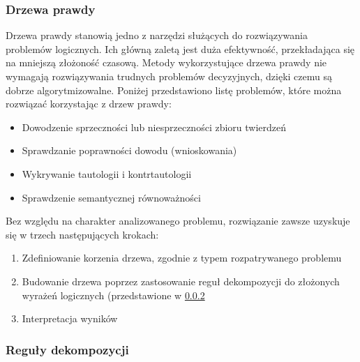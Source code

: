 \documentclass[12pt,a4paper,titlepage]{article}
\begin{document}
\subsubsection{Drzewa prawdy}
Drzewa prawdy stanowią jedno z narzędzi służących do rozwiązywania problemów logicznych. Ich główną zaletą jest duża efektywność, przekładająca się na mniejszą złożoność czasową. Metody wykorzystujące drzewa prawdy nie wymagają rozwiązywania trudnych problemów decyzyjnych, dzięki czemu są dobrze algorytmizowalne. Poniżej przedstawiono listę problemów, które można rozwiązać korzystając z drzew prawdy:

\begin{itemize}
	\item Dowodzenie sprzeczności lub niesprzeczności zbioru twierdzeń
	\item Sprawdzanie poprawności dowodu (wnioskowania)
	\item Wykrywanie tautologii i kontrtautologii
	\item Sprawdzenie semantycznej równoważności
\end{itemize}

Bez względu na charakter analizowanego problemu, rozwiązanie zawsze uzyskuje się w trzech następujących krokach:

\begin{enumerate}
	\item Zdefiniowanie korzenia drzewa, zgodnie z typem rozpatrywanego problemu
	\item Budowanie drzewa poprzez zastosowanie reguł dekompozycji do złożonych wyrażeń logicznych (przedstawione w \ref{dekompozycja}
	\item Interpretacja wyników
\end{enumerate}

\subsubsection{Reguły dekompozycji}
\label{dekompozycja}
\end{document}
